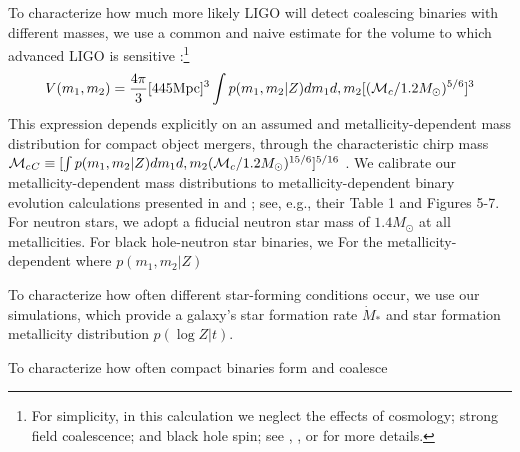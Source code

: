 \documentclass[nofootinbib,twocolumn,prd]{emulateapj}
\newcommand\mc{{\cal M}_c{}}
\newcommand\unit[1]{\text{#1}}
\begin{document}
\begin{widetext}
To characterize how much more likely LIGO will detect coalescing binaries with different masses, we use a common and
naive estimate for the volume to which advanced LIGO is sensitive \citep[see,e.g.,][]{PSellipticals}:\footnote{For
  simplicity, in this calculation we neglect the effects of cosmology; strong field coalescence; and black hole spin;
  see \cite{popsyn-LowMetallicityImpact2c-StarTrackRevised-2014}, \cite{AstroPaper}, or \cite{RatesPaper} for more details.}
\begin{eqnarray}
V(m_1,m_2) = \frac{4\pi}{3} [445 \unit{Mpc}]^3 \int p(m_1,m_2|Z) dm_1 d,m_2 [ (\mc/1.2 M_\odot)^{5/6}]^3
\end{eqnarray}
This expression depends explicitly on an assumed and metallicity-dependent mass distribution for compact object
mergers, through the characteristic chirp mass $\mc_{C}\equiv [\int p(m_1,m_2|Z) dm_1 d,m_2 (\mc/1.2
  M_\odot)^{15/6}]^{5/16}$ .  We calibrate our metallicity-dependent mass distributions to metallicity-dependent binary
evolution calculations presented in \cite{popsyn-LowMetallicityImpact2-StarTrackRevised-2012} and
\cite{popsyn-LowMetallicityImpact2c-StarTrackRevised-2014}; see, e.g., their Table 1 and Figures 5-7.    For neutron stars, we adopt a fiducial neutron star mass of $1.4 M_\odot$ at all metallicities.  For black
hole-neutron star binaries, we 
For the metallicity-dependent where $p(m_1,m_2|Z)$

To characterize how often different star-forming conditions occur, we use our simulations, which provide a galaxy's star formation rate
$\dot{M}_*$ and star formation metallicity distribution $p(\log Z|t)$.

To characterize how often compact binaries form and coalesce


\end{widetext}
\end{document}
